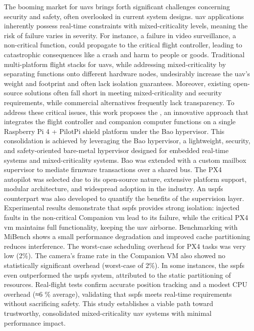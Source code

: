 
The booming market for \glspl{uav} brings forth significant challenges
concerning security and safety, often overlooked in current system designs. \gls{uav}
applications inherently possess real-time constraints with mixed-criticality
levels, meaning the risk of failure varies in severity. For instance, a failure
in video surveillance, a non-critical function, could propagate to the critical
flight controller, leading to catastrophic consequences like a crash and harm to
people or goods. Traditional multi-platform flight stacks for \glspl{uav}, while
addressing mixed-criticality by separating functions onto different hardware
nodes, undesirably increase the \gls{uav}'s weight and footprint and often lack
isolation guarantees. Moreover, existing open-source solutions often fall short
in meeting mixed-criticality and security requirements, while commercial
alternatives frequently lack transparency.
%
To address these critical issues, this work proposes the , an innovative approach that integrates the
flight controller and companion computer functions on a single Raspberry Pi 4 +
PilotPi shield platform under the Bao hypervisor. This consolidation is achieved by leveraging the Bao hypervisor, a
lightweight, security, and safety-oriented bare-metal hypervisor designed for
embedded real-time systems and mixed-criticality systems.
Bao was extended with a custom mailbox supervisor to mediate firmware
transactions over a shared bus.
The PX4 autopilot was selected due to its open-source nature, extensive platform
support, modular architecture, and widespread adoption in the industry.
An \gls{uspfs} counterpart was also developed to quantify the benefits of the supervision layer.
%
Experimental results demonstrate that \gls{sspfs} provides strong isolation: injected
faults in the non-critical Companion \gls{vm} lead to its failure, while the critical
PX4 \gls{vm} maintains full functionality, keeping the \gls{uav}
airborne. Benchmarking with MiBench shows a small performance degradation and
improved cache partitioning reduces interference.
The worst-case scheduling overhead for PX4 tasks was very low (2\%). The camera's frame rate in the Companion VM also
showed no statistically significant overhead (worst-case of 2\%). In some
instances, the \gls{sspfs} even outperformed the \gls{uspfs} system, attributed
to the static partitioning of resources.
Real-flight tests confirm accurate position tracking and a modest
CPU overhead (≈6 \% average), validating
that \gls{sspfs} meets real-time requirements without sacrificing safety. This
study establishes a viable path toward trustworthy, consolidated
mixed-criticality \gls{uav} systems with minimal performance impact.

